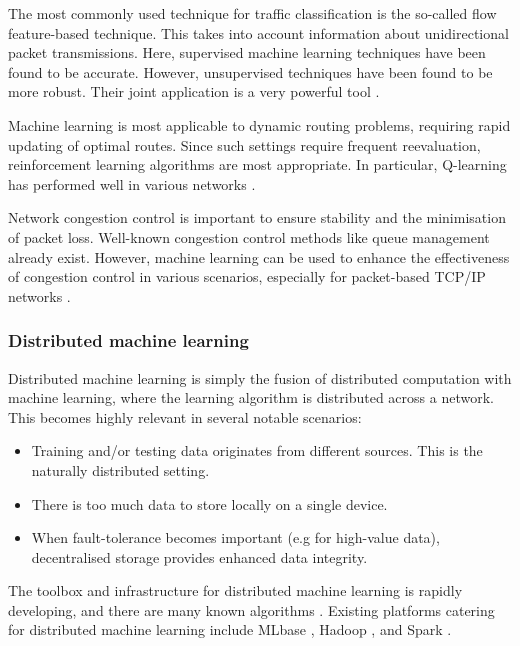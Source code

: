 The most commonly used technique for traffic classification is the so-called flow feature-based technique. This takes into account information about unidirectional packet transmissions. Here, supervised machine learning techniques have been found to be accurate. However, unsupervised techniques have been found to be more robust. Their joint application is a very powerful tool \cite{bib:erman2007offline, bib:zhang2015robust}.

Machine learning is most applicable to dynamic routing problems, requiring rapid updating of optimal routes. Since such settings require frequent reevaluation, reinforcement learning algorithms are most appropriate. In particular, Q-learning has performed well in various networks \cite{bib:wang2006adaptive, bib:forster2007froms, arroyo2007q}.

Network congestion control is important to ensure stability and the minimisation of packet loss. Well-known congestion control methods like queue management already exist. However, machine learning can be used to enhance the effectiveness of congestion control in various scenarios, especially for packet-based TCP/IP networks \cite{bib:liu2002end, bib:barman2004model, bib:el2005improving}. 

\subsubsection{Distributed machine learning}

Distributed machine learning is simply the fusion of distributed computation with machine learning, where the learning algorithm is distributed across a network. This becomes highly relevant in several notable scenarios:
\begin{itemize}
\item Training and/or testing data originates from different sources. This is the naturally distributed setting.
\item There is too much data to store locally on a single device.
\item When fault-tolerance becomes important (e.g for high-value data), decentralised storage provides enhanced data integrity.
\end{itemize}

The toolbox and infrastructure for distributed machine learning is rapidly developing, and there are many known algorithms \cite{bib:peteiro2013survey, bib:florian2013}. Existing platforms catering for distributed machine learning include MLbase \cite{bib:MLbase}, Hadoop \cite{bib:white2012hadoop}, and Spark \cite{bib:shanahan2015large}.

